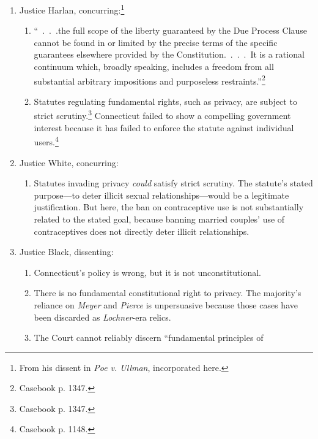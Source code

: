 \begin{enumerate}
\begin{enumerate}
        but it is implied in the Ninth Amendment because it is a ``fundamental 
        and basic'' right.\footnote{Casebook p. 1346.}
    \end{enumerate}
    \item Justice Harlan, concurring:\footnote{From his dissent in \emph{Poe 
    v. Ullman}, incorporated here.}
    \begin{enumerate}
        \item ``~.~.~.the full scope of the liberty guaranteed by the Due 
        Process Clause cannot be found in or limited by the precise terms of 
        the specific guarantees elsewhere provided by the 
        Constitution.~.~.~.~It is a rational continuum which, broadly 
        speaking, includes a freedom from all substantial arbitrary 
        impositions and purposeless restraints.''\footnote{Casebook p. 1347.}
        \item Statutes regulating fundamental rights, such as privacy, are 
        subject to strict scrutiny.\footnote{Casebook p. 1347.} Connecticut 
        failed to show a compelling government interest because it has failed 
        to enforce the statute against individual users.\footnote{Casebook p. 
        1148.}
    \end{enumerate}
    \item Justice White, concurring:
    \begin{enumerate}
        \item Statutes invading privacy \emph{could} satisfy strict scrutiny. 
        The statute's stated purpose---to deter illicit sexual 
        relationships---would be a legitimate justification. But here, the ban 
        on contraceptive use is not substantially related to the stated goal, 
        because banning married couples' use of contraceptives does not 
        directly deter illicit relationships.
    \end{enumerate}
    \item Justice Black, dissenting:
    \begin{enumerate}
        \item Connecticut's policy is wrong, but it is not unconstitutional.
        \item There is no fundamental constitutional right to privacy. The 
        majority's reliance on \emph{Meyer} and \emph{Pierce} is unpersuasive 
        because those cases have been discarded as \emph{Lochner}-era relics.
        \item The Court cannot reliably discern ``fundamental principles of 

\end{enumerate}
\end{enumerate}
